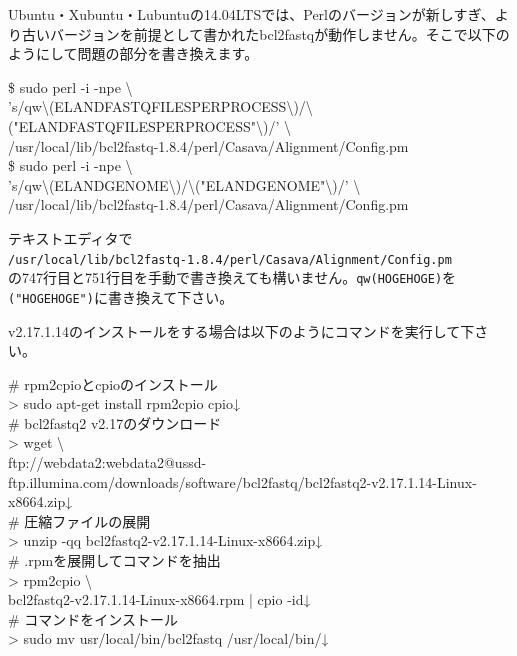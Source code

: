 \documentclass[titlepage,10pt,a4paper]{jsbook}
\newenvironment{cmd}{\begin{oframed}\raggedright\ttfamily\footnotesize\setlength{\baselineskip}{1.4em}}{\end{oframed}\vspace{-1em}}
\begin{document}
Ubuntu・Xubuntu・Lubuntuの14.04LTSでは、Perlのバージョンが新しすぎ、より古いバージョンを前提として書かれたbcl2fastqが動作しません。そこで以下のようにして問題の部分を書き換えます。
\begin{cmd}
\$ sudo perl -i -npe {\textbackslash}\\
's/qw{\textbackslash}(ELAND{\textunderscore}FASTQ{\textunderscore}FILES{\textunderscore}PER{\textunderscore}PROCESS{\textbackslash})/{\textbackslash}("ELAND{\textunderscore}FASTQ{\textunderscore}FILES{\textunderscore}PER{\textunderscore}PROCESS"{\textbackslash})/' {\textbackslash}\\
/usr/local/lib/bcl2fastq-1.8.4/perl/Casava/Alignment/Config.pm\\
\$ sudo perl -i -npe {\textbackslash}\\
's/qw{\textbackslash}(ELAND{\textunderscore}GENOME{\textbackslash})/{\textbackslash}("ELAND{\textunderscore}GENOME"{\textbackslash})/' {\textbackslash}\\
/usr/local/lib/bcl2fastq-1.8.4/perl/Casava/Alignment/Config.pm
\end{cmd}
テキストエディタで\\
\texttt{/usr/local/lib/bcl2fastq-1.8.4/perl/Casava/Alignment/Config.pm}\\
の747行目と751行目を手動で書き換えても構いません。\texttt{qw(HOGEHOGE)}を\texttt{("HOGEHOGE")}に書き換えて下さい。

v2.17.1.14のインストールをする場合は以下のようにコマンドを実行して下さい。
\begin{cmd}
\# rpm2cpioとcpioのインストール\\
{\textgreater} sudo apt-get install rpm2cpio cpio↓\\
\# bcl2fastq2 v2.17のダウンロード\\
{\textgreater} wget {\textbackslash}\\
ftp://webdata2:webdata2@ussd-ftp.illumina.com/downloads/software/bcl2fastq/bcl2fastq2-v2.17.1.14-Linux-x86{\textunderscore}64.zip↓\\
\# 圧縮ファイルの展開\\
{\textgreater} unzip -qq bcl2fastq2-v2.17.1.14-Linux-x86{\textunderscore}64.zip↓\\
\# .rpmを展開してコマンドを抽出\\
{\textgreater} rpm2cpio {\textbackslash}\\
bcl2fastq2-v2.17.1.14-Linux-x86{\textunderscore}64.rpm | cpio -id↓\\
\# コマンドをインストール\\
{\textgreater} sudo mv usr/local/bin/bcl2fastq /usr/local/bin/↓
\end{cmd}
\end{document}
